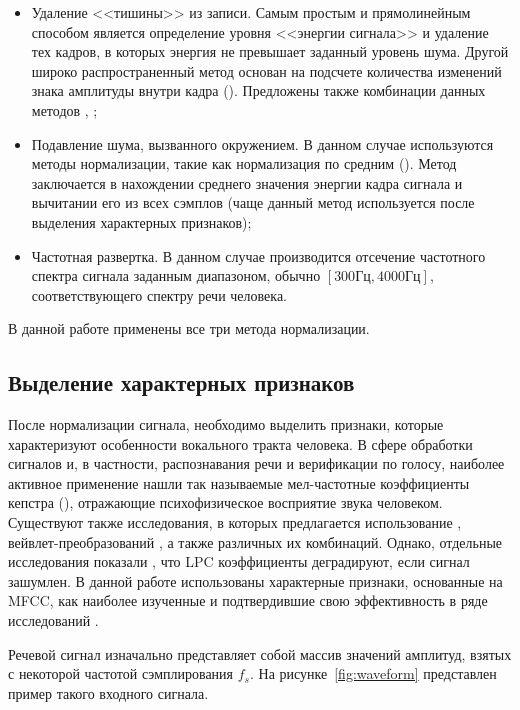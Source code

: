 \begin{itemize}
\item Удаление <<тишины>> из записи. Самым простым и прямолинейным способом является определение уровня <<энергии сигнала>> и удаление тех кадров, в которых энергия не превышает заданный уровень шума. Другой широко распространенный метод основан на подсчете количества изменений знака амплитуды внутри кадра (). Предложены также комбинации данных методов \cite{Greenwood00suv}, \cite{Bachu04zcr};
\item Подавление шума, вызванного окружением. В данном случае используются методы нормализации, такие как нормализация по средним (). Метод заключается в нахождении среднего значения энергии кадра сигнала и вычитании его из всех сэмплов (чаще данный метод используется после выделения характерных признаков);
\item Частотная развертка. В данном случае производится отсечение частотного спектра сигнала заданным диапазоном, обычно $[300\textrm{Гц}, 4000\textrm{Гц}]$, соответствующего спектру речи человека.
\end{itemize}

В данной работе применены все три метода нормализации.

\subsection{Выделение характерных признаков}

После нормализации сигнала, необходимо выделить признаки, которые характеризуют особенности вокального тракта человека. В сфере обработки сигналов и, в частности, распознавания речи и верификации по голосу, наиболее активное применение нашли так называемые мел-частотные коэффициенты кепстра (), отражающие психофизическое восприятие звука человеком. Существуют также исследования, в которых предлагается использование , вейвлет-преобразований \cite{Medvedev06wavelets}, а также различных их комбинаций. Однако, отдельные исследования показали \cite{Tierney80LPC}, что LPC коэффициенты деградируют, если сигнал зашумлен. В данной работе использованы характерные признаки, основанные на MFCC, как наиболее изученные и подтвердившие свою эффективность в ряде исследований \cite{Jayanna09overview}.

Речевой сигнал изначально представляет собой массив значений амплитуд, взятых с некоторой частотой сэмплирования $f_s$. На рисунке~\ref{fig:waveform} представлен пример такого входного сигнала.

